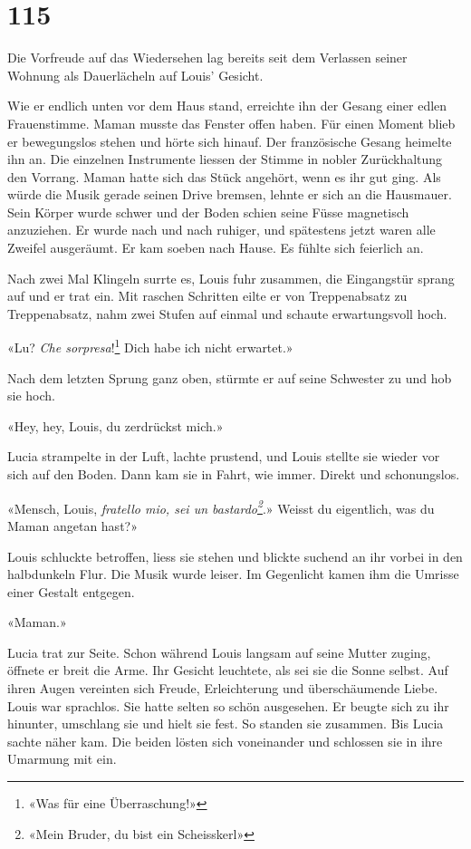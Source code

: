 \chapter{115}



Die Vorfreude auf das Wiedersehen lag bereits seit dem Verlassen seiner
Wohnung als Dauerlächeln auf Louis’ Gesicht.

Wie er endlich unten vor dem Haus stand, erreichte ihn der Gesang einer
edlen Frauenstimme. Maman musste das Fenster offen haben. Für einen
Moment blieb er bewegungslos stehen und hörte sich hinauf. Der
französische Gesang heimelte ihn an. Die einzelnen Instrumente liessen
der Stimme in nobler Zurückhaltung den Vorrang. Maman hatte sich das
Stück angehört, wenn es ihr gut ging. Als würde die Musik gerade seinen
Drive bremsen, lehnte er sich an die Hausmauer. Sein Körper wurde schwer
und der Boden schien seine Füsse magnetisch anzuziehen. Er wurde nach
und nach ruhiger, und spätestens jetzt waren alle Zweifel ausgeräumt. Er
kam soeben nach Hause. Es fühlte sich feierlich an.


Nach zwei Mal Klingeln surrte es, Louis fuhr zusammen, die Eingangstür
sprang auf und er trat ein.
Mit raschen Schritten eilte er von Treppenabsatz zu Treppenabsatz, nahm
zwei Stufen auf einmal und schaute erwartungsvoll hoch.

«Lu? \emph{Che sorpresa}!\footnote{«Was für eine Überraschung!»} Dich habe ich nicht erwartet.»

Nach dem letzten Sprung ganz oben, stürmte er auf seine Schwester zu und
hob sie hoch.

«Hey, hey, Louis, du zerdrückst mich.»

Lucia strampelte in der Luft, lachte prustend, und Louis stellte sie
wieder vor sich auf den Boden. Dann kam sie in Fahrt, wie immer. Direkt
und schonungslos.

«Mensch, Louis, \emph{fratello mio, sei un bastardo\footnote{«Mein Bruder, du bist ein Scheisskerl»}}.» Weisst du eigentlich, was du Maman angetan hast?»

Louis schluckte betroffen, liess sie stehen und blickte suchend an ihr
vorbei in den halbdunkeln Flur. Die Musik wurde leiser. Im Gegenlicht
kamen ihm die Umrisse einer Gestalt entgegen.

«Maman.»

Lucia trat zur Seite. Schon während Louis langsam auf seine Mutter
zuging, öffnete er breit die Arme. Ihr Gesicht leuchtete, als sei sie
die Sonne selbst. Auf ihren Augen vereinten sich Freude, Erleichterung
und überschäumende Liebe. Louis war sprachlos. Sie hatte selten so schön
ausgesehen. Er beugte sich zu ihr hinunter, umschlang sie und hielt sie
fest.
So standen sie zusammen. Bis Lucia sachte näher kam. Die beiden lösten sich
voneinander und schlossen sie in ihre Umarmung mit ein.
